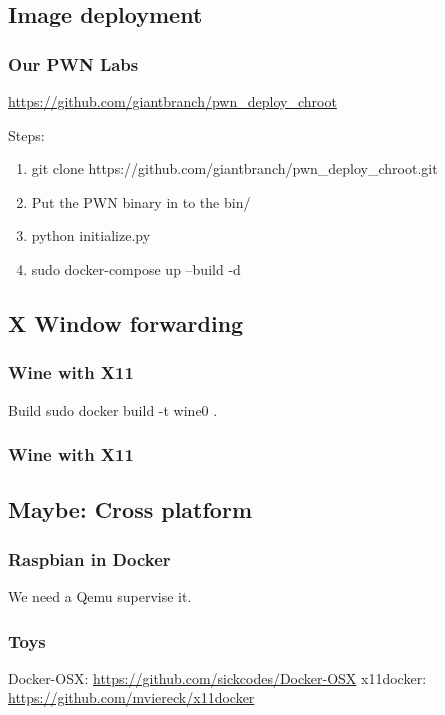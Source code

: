 \documentclass{beamer}
\begin{document}
\subsection{Image deployment}
\begin{frame}
    \frametitle{Our PWN Labs}
    \url{https://github.com/giantbranch/pwn_deploy_chroot}\\
    \begin{block}{Steps:}
        \begin{enumerate}
            \item git clone https://github.com/giantbranch/pwn\_deploy\_chroot.git
            \item Put the PWN binary in to the bin/
            \item python initialize.py
            \item sudo docker-compose up --build -d
        \end{enumerate}
    \end{block}

\end{frame}

\subsection{X Window forwarding}
\begin{frame}
    \frametitle{Wine with X11}
    
    \begin{block}{Build}
        sudo docker build -t wine0 .
    \end{block}
\end{frame}

\begin{frame}
    \frametitle{Wine with X11}
    
\end{frame}

\subsection{Maybe: Cross platform}
\begin{frame}
    \frametitle{Raspbian in Docker}
    \centering We need a Qemu supervise it.
    
\end{frame}

\begin{frame}
    \frametitle{Toys}
    Docker-OSX: \url{https://github.com/sickcodes/Docker-OSX}
    \newline
    x11docker: \url{https://github.com/mviereck/x11docker}
\end{frame}
\end{document}
